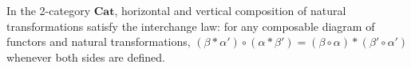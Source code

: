 In the 2-category $\mathbf{Cat}$, horizontal and vertical composition of natural transformations satisfy the interchange law: for any composable diagram of functors and natural transformations, $(\beta * \alpha') \circ (\alpha * \beta') = (\beta \circ \alpha) * (\beta' \circ \alpha')$ whenever both sides are defined.
